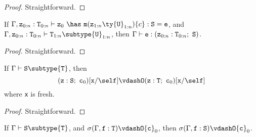 \begin{proof}
Straightforward.
\end{proof}

\begin{lemma}
\label{body-type}
If
$\Gamma, {\tt z}_{0:n}: {\tt T}_{0:n} \vdash {\tt z}_0\ \has\ {\tt m}({\tt z}_{1:n} \ty {\tt U}_{1:n})\{c\}: {\tt S} = {\tt e}$,
and 
$\Gamma, {\tt z}_{0:n}: {\tt T}_{0:n} \vdash {\tt T}_{1:n} \subtype {\tt U}_{1:n}$,
then
$\Gamma \vdash {\tt e}: ({\tt z}_{0:n}: {\tt T}_{0:n};\ {\tt S})$.
\end{lemma}

\begin{proof}
Straightforward.
\end{proof}

\begin{lemma}
\label{existential-subtyping}
If   $\Gamma \vdash {\tt S} \subtype {\tt T}$,
then $$({\tt z}:{\tt S};~{\tt c}_0)[{\tt x}/\self] \vdashO ({\tt z}:{\tt T};~{\tt c}_0)[{\tt x}/\self]$$
where {\tt x} is fresh.
\end{lemma}

\begin{proof}
Straightforward.
\end{proof}



\begin{lemma}
\label{constraint-lemma} %
If   $\Gamma \vdash {\tt S} \subtype {\tt T}$,
and  $\sigma(\Gamma,{\tt f}: {\tt T}) \vdashO {\tt c}_0$,
then $\sigma(\Gamma,{\tt f}: {\tt S}) \vdashO {\tt c}_0$.
\end{lemma}

